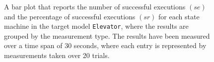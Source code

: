 \begin{figure}[h!]
\centering
\begin{minipage}{1\textwidth}
  \centering
  \makebox[\textwidth][c]{ %
        \resizebox{1.19\textwidth}{!}{ %
            
        }%
    }%
\end{minipage}
\caption{A bar plot that reports the number of successful executions $(se)$ and the percentage of successful executions $(sr)$ for each state machine in the target model \texttt{Elevator}, where the results are grouped by the measurement type. The results have been measured over a time span of 30 seconds, where each entry is represented by measurements taken over 20 trials.}
\label{figure:counting_logging_state_machine_transition_frequency_comparison_elevator}
\end{figure}